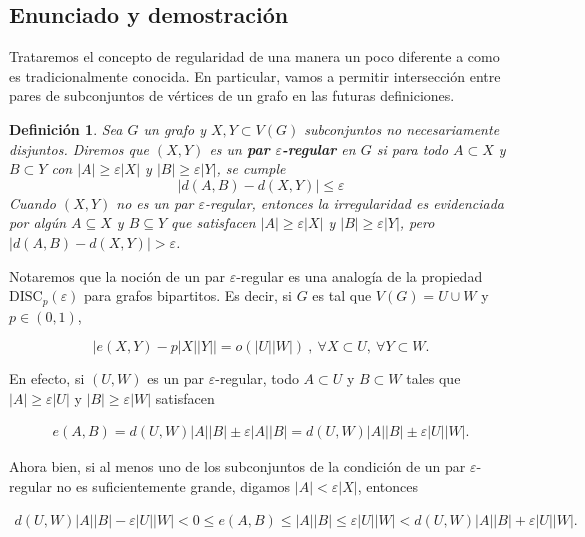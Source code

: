 \documentclass{article}[14pts]
\newtheorem{definicion}{Definición}
\newcommand{\disc}{\mathrm{DISC}}
\let\varepsilon=\varepsilon
\begin{document}
\subsection{Enunciado y demostración}\medskip

Trataremos el concepto de regularidad de una manera un poco diferente a como es tradicionalmente conocida. En particular, vamos a permitir intersección entre pares de subconjuntos de vértices de un grafo en las futuras definiciones.\medskip

\begin{definicion}
    Sea $G$ un grafo y $X,Y \subset V(G)$ subconjuntos no necesariamente disjuntos. Diremos que $(X,Y)$ es un \textbf{par $\varepsilon$-regular} en $G$ si para todo $A\subset X$ y $B\subset Y$ con $|A| \geq \varepsilon |X|$ y $|B|\geq \varepsilon |Y|$, se cumple
    \[
    \Big| d(A,B) - d(X,Y)\Big| \leq \varepsilon
    \]
    Cuando $(X,Y)$ no es un par $\varepsilon$-regular, entonces la irregularidad es evidenciada por algún $A\subseteq X$ y $B\subseteq Y$ que satisfacen $|A| \geq \varepsilon |X|$ y $|B|\geq \varepsilon |Y|$, pero $\Big| d(A,B) - d(X,Y)\Big| > \varepsilon$.
\end{definicion}\medskip

Notaremos que la noción de un par $\varepsilon$-regular es una analogía de la propiedad $\disc_p(\varepsilon)$ para grafos bipartitos. Es decir, si $G$ es tal que $V(G) = U\cup W$ y $p\in (0,1)$,\medskip

\begin{equation*}
    \Big| e(X,Y) - p|X||Y|\Big| = o(|U||W|)\ ,\ \forall X\subset U,\ \forall Y\subset W.
\end{equation*}\medskip

En efecto, si $(U,W)$ es un par $\varepsilon$-regular, todo $A\subset U$ y $B\subset W$ tales que $|A|\geq\varepsilon |U|$ y $|B|\geq\varepsilon |W|$ satisfacen\medskip

\begin{align*}
    e(A,B) = d(U,W)|A||B| \pm \varepsilon|A||B| = d(U,W)|A||B| \pm \varepsilon|U||W|.
\end{align*}\medskip

Ahora bien, si al menos uno de los subconjuntos de la condición de un par $\varepsilon$-regular no es suficientemente grande, digamos $|A| < \varepsilon|X|$, entonces\medskip

\begin{align*}
    d(U,W)|A||B| - \varepsilon |U||W| < 0 \leq e(A,B) \leq |A||B| \leq \varepsilon |U||W| < d(U,W)|A||B| + \varepsilon|U||W|.
\end{align*}\medskip
\end{document}
